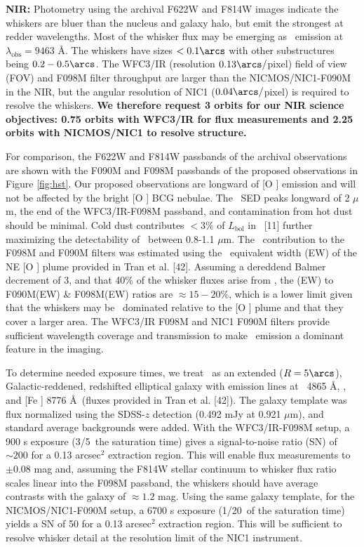 \documentclass[12pt]{article}
\begin{document}
\describeobservations

{\bf{NIR:}} Photometry using the archival F622W and F814W images
indicate the whiskers are bluer than the nucleus and galaxy halo, but
emit the strongest at redder wavelengths. Most of the whisker flux may
be emerging as \halpha\ emission at $\lambda_{\mathrm{obs}} = 9463$
\AA. The whiskers have sizes $< 0.1\arcs$ with other substructures
being $0.2-0.5\arcs$. The WFC3/IR (resolution $0.13\arcs/$pixel) field
of view (FOV) and F098M filter throughput are larger than the
NICMOS/NIC1-F090M in the NIR, but the angular resolution of NIC1
($0.04\arcs/$pixel) is required to resolve the whiskers. {\bf{We
    therefore request 3 orbits for our NIR science objectives: 0.75
    orbits with WFC3/IR for flux measurements and 2.25 orbits with
    NICMOS/NIC1 to resolve structure.}}

For comparison, the F622W and F814W passbands of the archival
observations are shown with the F090M and F098M passbands of the
proposed observations in Figure \ref{fig:hst}.  Our proposed
observations are longward of [O ] emission and will not be
affected by the bright [O ] BCG nebulae. The \irs\ SED peaks
longward of 2 $\mu$m, the end of the WFC3/IR-F098M passband, and
contamination from hot dust should be minimal. Cold dust contributes
$< 3\%$ of $L_{\mathrm{bol}}$ in \irs\ [11] further maximizing the
detectability of \halpha\ between 0.8-1.1 $\mu$m. The
\halpha\ contribution to the F098M and F090M filters was estimated
using the \hbeta\ equivalent width (EW) of the NE [O ] plume
provided in Tran et al. [42]. Assuming a dereddend Balmer decrement of
3, and that 40\% of the whisker fluxes arise from \halpha, the
\halpha(EW) to F090M(EW) \& F098M(EW) ratios are $\approx 15-20\%$,
which is a lower limit given that the whiskers may be
\halpha\ dominated relative to the [O ] plume and that they
cover a larger area. The WFC3/IR F098M and NIC1 F090M filters provide
sufficient wavelength coverage and transmission to make
\halpha\ emission a dominant feature in the imaging.

To determine needed exposure times, we treat \irs\ as an extended ($R
= 5\arcs$), Galactic-reddened, redshifted elliptical galaxy with
emission lines at \hbeta\ 4865 \AA, \oiii, and [Fe ] 8776
\AA\ (fluxes provided in Tran et al. [42]). The galaxy template was
flux normalized using the SDSS-$z$ detection (0.492 mJy at 0.921
$\mu$m), and standard average backgrounds were added. With the
WFC3/IR-F098M setup, a 900 s exposure (3/5\ths\ the saturation time)
gives a signal-to-noise ratio (SN) of $\sim 200$ for a 0.13 arcsec$^2$
extraction region. This will enable flux measurements to $\pm 0.08$
mag and, assuming the F814W stellar continuum to whisker flux ratio
scales linear into the F098M passband, the whiskers should have
average contrasts with the galaxy of $\approx 1.2$ mag. Using the same
galaxy template, for the NICMOS/NIC1-F090M setup, a 6700 s exposure
(1/20\ths\ of the saturation time) yields a SN of 50 for a 0.13
arcsec$^2$ extraction region. This will be sufficient to resolve
whisker detail at the resolution limit of the NIC1 instrument.
\end{document}
